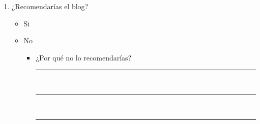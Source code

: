 \documentclass[a4paper,10pt]{article}
\begin{document}
\begin{enumerate}
    \item ¿Recomendarías el blog?
    \begin{itemize}
        \item Si
        \item No
        \begin{itemize}
            \item ¿Por qué no lo recomendarías?
            
            \rule{100mm}{0.1mm} \\
            \rule{100mm}{0.1mm} \\
            \rule{100mm}{0.1mm}
        \end{itemize}
    \end{itemize}
    
\end{enumerate}
\end{document}
